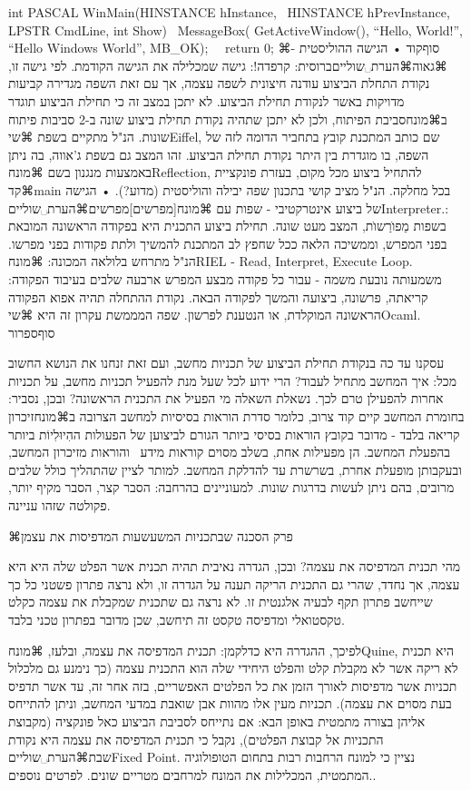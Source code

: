 {int PASCAL WinMain(HINSTANCE hInstance,
 HINSTANCE hPrevInstance, LPSTR CmdLine, int Show)
{
 MessageBox(
	GetActiveWindow(),
	“Hello, World!”,
	“Hello Windows World”,
	MB_OK);
  return 0;
}
⌘סוף{קוד}
• הגישה ההוליסטית - ⌘גאוה⌘הערת␣שוליים{ברוסית: קרפדה!}: גישה שמכלילה את הגישה הקודמת. לפי גישה זו, נקודת התחלת הביצוע עודנה חיצונית לשפה עצמה, אך עם זאת השפה מגדירה קביעות מדויקות באשר לנקודת תחילת הביצוע. לא יתכן במצב זה כי תחילת הביצוע תוגדר ב⌘מונח{סביבת הפיתוח}, ולכן לא יתכן שתהיה נקודת תחילת ביצוע שונה ב-2 סביבות פיתוח שונות. הנ"ל מתקיים בשפת ⌘שי{Eiffel}, שם כותב המתכנת קובץ בתחביר הדומה לזה של השפה, בו מוגדרת בין היתר נקודת תחילת הביצוע. זהו המצב גם בשפת ג'אווה, בה ניתן באמצעות מנגנון בשם ⌘מונח{Reflection}, להתחיל ביצוע מכל מקום, בעזרת פונקציית ⌘קד{main} בכל מחלקה. הנ"ל מציב קושי בתכנון שפה יבילה והוליסטית (מדוע?).
• הגישה של ביצוע אינטרקטיבי - שפות עם ⌘מונח[מפרשים]{מפרשים}⌘הערת␣שוליים{Interpreter.}: בשפות מֵפוׂרַשוׂת, המצב מעט שונה. תחילת ביצוע התכנית היא בפקודה הראשונה המובאת בפני המפרש, וממשיכה הלאה ככל שחפץ לב המתכנת להמשיך ולתת פקודות בפני מפרשו. הנ"ל מתרחש בלולאה המכונה: ⌘מונח{RIEL - Read, Interpret, Execute Loop}. משמעותה נובעת משמה - עבור כל פקודה מבצע המפרש ארבעה שלבים בעיבוד הפקודה: קריאתה, פרשונה, ביצועה והמשך לפקודה הבאה. נקודת ההתחלה תהיה אפוא הפקודה הראשונה המוקלדת, או הנטענת לפרשון. שפה המממשת עקרון זה היא  ⌘שי{Ocaml}.
סוף{ספרור}

עסקנו עד כה בנקודת תחילת הביצוע של תכניות מחשב, ועם זאת זנחנו את הנושא החשוב מכל: איך המחשב מתחיל לעבוד? הרי ידוע לכל שעל מנת להפעיל תכניות מחשב, על תכניות אחרות להפעילן טרם לכך. נשאלת השאלה מי הפעיל את התכנית הראשונה? ובכן, נסביר: בחומרת המחשב קיים קוד צרוב, כלומר סדרת הוראות בסיסיות למחשב הצרובה ב⌘מונח{זיכרון קריאה בלבד} - מדובר בקובץ הוראות בסיסי ביותר הגורם לביצוען של הפעולות ההִיוּלִיוֹת ביותר בהפעלת המחשב. הן מפעילות אחת, בשלב מסוים קוראות מידע  והוראות מזיכרון המחשב, ובעקבותן מופעלת אחרת, בשרשרת עד להדלקת המחשב. למותר לציין שהתהליך כולל שלבים מרובים, בהם ניתן לעשות בדרגות שונות. למעוניינים בהרחבה: הסבר קצר, הסבר מקיף יותר, פקולטה שזהו עניינה.




⌘פרק הסכנה שבתכניות המשעשעות המדפיסות את עצמן

מהי תכנית המדפיסה את עצמה? ובכן, הגדרה נאיבית תהיה תכנית אשר הפלט שלה היא היא עצמה, אך נחדד, שהרי גם התכנית הריקה תענה על הגדרה זו, ולא נרצה פתרון פשטני כל כך שייחשב פתרון תקף לבעיה אלגנטית זו. לא נרצה גם שתכנית שמקבלת את עצמה כקלט טקסטואלי ומדפיסה טקסט זה תיחשב, שכן מדובר בפתרון טכני בלבד. 

לפיכך, ההגדרה היא כדלקמן: תכנית המדפיסה את עצמה, ובלעז, ⌘מונח{Quine}, היא תכנית לא ריקה אשר לא מקבלת קלט והפלט היחידי שלה הוא התכנית עצמה (כך נימנע גם מלכלול תכניות אשר מדפיסות לאורך הזמן את כל הפלטים האפשריים, בזה אחר זה, עד אשר תדפיס בעת מסוים את עצמה). תכניות מעין אלו מהוות אבן שואבת במדעי המחשב, וניתן להתייחס אליהן בצורה מתמטית באופן הבא: אם נתייחס לסביבת הביצוע כאל פונקציה (מקבוצת התכניות אל קבוצת הפלטים), נקבל כי תכנית המדפיסה את עצמה היא נקודת שבת⌘הערת␣שוליים{Fixed Point. נציין כי למונח הרחבות רבות בתחום הטופולוגיה המתמטית, המכלילות את המונח למרחבים מטריים שונים. לפרטים נוספים.}. 

}
